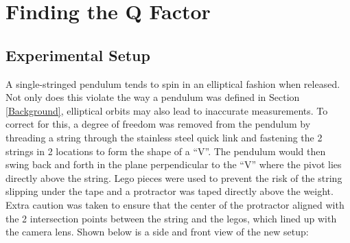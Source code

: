 \documentclass[12pt]{article}
\begin{document}
\newpage

\section{Finding the Q Factor} \label{Finding the Q Factor}

\subsection{Experimental Setup}
{\color{blue}
A single-stringed pendulum tends to spin in an elliptical fashion when released. Not only does this violate the way a pendulum was defined in Section \ref{Background}, elliptical orbits may also lead to inaccurate measurements. To correct for this,} a degree of freedom was removed from the pendulum by threading a string through the stainless steel quick link and fastening the 2 strings in 2 locations to form the shape of a ``V''. The pendulum would then swing back and forth in the plane perpendicular to the ``V'' {\color{blue} where the pivot lies directly above the string. Lego pieces were used to prevent the risk of the string slipping under the tape and a protractor was taped directly above the weight. Extra caution was taken to ensure that the center of the protractor aligned with the 2 intersection points between the string and the legos, which lined up with the camera lens. Shown below is a side and front view of the new setup:}
\end{document}
